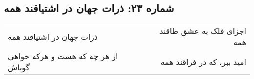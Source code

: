\begin{center}
\section*{شماره ۲۳: ذرات جهان در اشتیاقند همه}
\label{sec:023}
\begin{longtable}{l p{0.5cm} r}
ذرات جهان در اشتیاقند همه
&&
اجزای فلک به عشق طاقند همه
\\
از هر چه که هست و هرکه خواهی گوباش
&&
امید ببر، که در فراقند همه
\\
\end{longtable}
\end{center}
